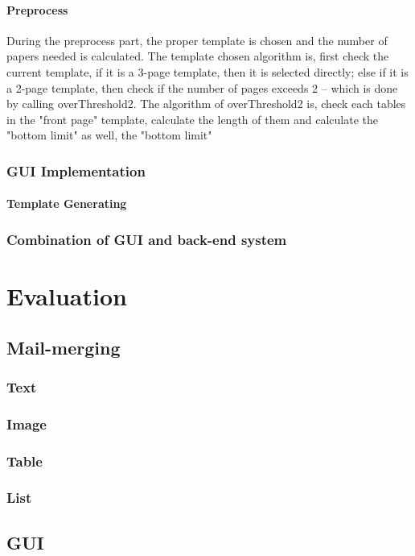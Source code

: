 \documentclass{report}
\begin{document}
\subsubsection{Preprocess}

  During the preprocess part, the proper template is chosen and the number of papers needed is calculated. The template chosen algorithm is, first check the current template, if it is a 3-page template, then it is selected directly; else if it is a 2-page template, then check if the number of pages exceeds 2 -- which is done by calling overThreshold2. The algorithm of overThreshold2 is, check each tables in the "front page" template, calculate the length of them and calculate the "bottom limit" as well, the "bottom limit" 

\subsection{GUI Implementation}
\subsubsection{Template Generating}
\subsection{Combination of GUI and back-end system}

\chapter{Evaluation}
\section{Mail-merging}
\subsection{Text}
\subsection{Image}
\subsection{Table}
\subsection{List}
\section{GUI}
\end{document}
